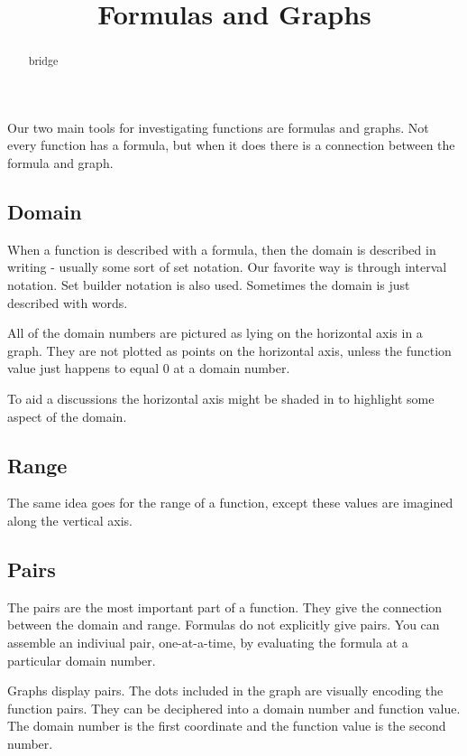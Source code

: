 \documentclass{ximera}
\title{Formulas and Graphs}
\begin{document}
\begin{abstract}
bridge
\end{abstract}
\maketitle



Our two main tools for investigating functions are formulas and graphs. Not every function has a formula, but when it does there is a connection between the formula and graph.

\subsection{Domain}
When a function is described with a formula, then the domain is described in writing - usually some sort of set notation.  Our favorite way is through interval notation.  Set builder notation is also used.  Sometimes the domain is just described with words.

All of the domain numbers are pictured as lying on the horizontal axis in a graph.  They are not plotted as points on the horizontal axis, unless the function value just happens to equal $0$ at a domain number.

To aid a discussions the horizontal axis might be shaded in to highlight some aspect of the domain.







\subsection{Range}
The same idea goes for the range of a function, except these values are imagined along the vertical axis.








\subsection{Pairs}
The pairs are the most important part of a function.  They give the connection between the domain and range.  Formulas do not explicitly give pairs. You can assemble an indiviual pair, one-at-a-time, by evaluating the formula at a particular domain number.

Graphs display pairs.  The dots included in the graph are visually encoding the function pairs.  They can be deciphered into a domain number and function value. The domain number is the first coordinate and the function value is the second number.
\end{document}
